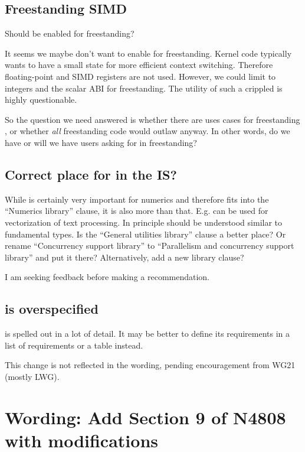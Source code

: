 \subsection{Freestanding SIMD}\label{sec:freestanding}
Should  be enabled for freestanding?

It seems we maybe don't want to enable \simd for freestanding.
Kernel code typically wants to have a small state for more efficient
context switching.
Therefore floating-point and SIMD registers are not used.
However, we could limit \simd to integers and the scalar ABI for freestanding.
The utility of such a crippled \simd is highly questionable.

So the question we need answered is whether there are uses cases for
freestanding \simd, or whether \emph{all} freestanding code would outlaw \simd
anyway.
In other words, do we have or will we have users asking for \simd in
freestanding?

\subsection{Correct place for  in the IS?}

While  is certainly very important for numerics and therefore fits into the “Numerics library” clause, it is also more than that.
E.g.  can be used for vectorization of text processing.
In principle  should be understood similar to fundamental types.
Is the “General utilities library” clause a better place?
Or rename “Concurrency support library” to “Parallelism and concurrency support library” and put it there?
Alternatively, add a new library clause?

I am seeking feedback before making a recommendation.

\subsection{ is overspecified}
 is spelled out in a lot of detail.
It may be better to define its requirements in a list of requirements or a table instead.

This change is not reflected in the wording, pending encouragement from WG21 (mostly LWG).

\section{Wording: Add Section 9 of N4808 with modifications}\label{sec:wording}

